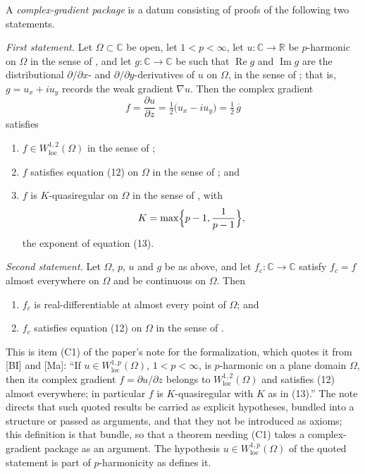 \begin{definition}
A \emph{complex-gradient package} is a datum consisting of proofs of the
following two statements.

\emph{First statement.}  Let $\Omega\subset\mathbb{C}$ be open, let $1<p<\infty$, let
$u\colon\mathbb{C}\to\mathbb{R}$ be $p$-harmonic on $\Omega$ in the sense of
, and let $g\colon\mathbb{C}\to\mathbb{C}$ be such that
$\operatorname{Re}g$ and $\operatorname{Im}g$ are the distributional
$\partial/\partial x$- and $\partial/\partial y$-derivatives of $u$ on
$\Omega$, in the sense of ; that is, $g=u_x+iu_y$
records the weak gradient $\nabla u$.  Then the complex gradient
\[
  f=\frac{\partial u}{\partial z}=\tfrac12\bigl(u_x-iu_y\bigr)=\tfrac12\,\overline{g}
\]
satisfies
\begin{enumerate}
\item[(a)] $f\in W^{1,2}_{\mathrm{loc}}(\Omega)$ in the sense of
;
\item[(b)] $f$ satisfies equation (12) on $\Omega$ in the sense of
; and
\item[(c)] $f$ is $K$-quasiregular on $\Omega$ in the sense of
, with
\[
  K=\max\Bigl\{p-1,\frac{1}{p-1}\Bigr\},
\]
the exponent of equation (13).
\end{enumerate}

\emph{Second statement.}  Let $\Omega$, $p$, $u$ and $g$ be as above, and let
$f_c\colon\mathbb{C}\to\mathbb{C}$ satisfy $f_c=f$ almost everywhere on
$\Omega$ and be continuous on $\Omega$.  Then
\begin{enumerate}
\item[(d)] $f_c$ is real-differentiable at almost every point of $\Omega$; and
\item[(e)] $f_c$ satisfies equation (12) on $\Omega$ in the sense of
.
\end{enumerate}

This is item (C1) of the paper's note for the formalization, which quotes it
from [BI] and [Ma]: ``If $u\in W^{1,p}_{\mathrm{loc}}(\Omega)$,
$1<p<\infty$, is $p$-harmonic on a plane domain $\Omega$, then its complex
gradient $f=\partial u/\partial z$ belongs to $W^{1,2}_{\mathrm{loc}}(\Omega)$
and satisfies (12) almost everywhere; in particular $f$ is $K$-quasiregular
with $K$ as in (13).''  The note directs that such quoted results be carried
as explicit hypotheses, bundled into a structure or passed as arguments, and
that they not be introduced as axioms; this definition is that bundle, so that
a theorem needing (C1) takes a complex-gradient package as an argument.  The
hypothesis $u\in W^{1,p}_{\mathrm{loc}}(\Omega)$ of the quoted statement is
part of $p$-harmonicity as  defines it.


\end{definition}
